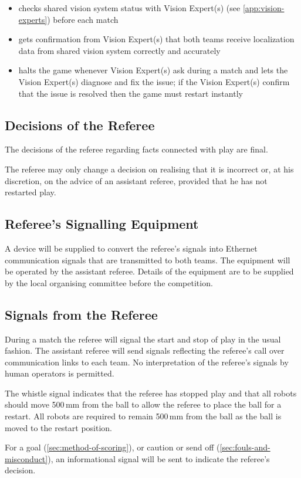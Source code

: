 \begin{itemize}
\item checks shared vision system status with Vision Expert(s) (see \autoref{app:vision-experts}) before each match
\item gets confirmation from Vision Expert(s) that both teams receive localization data from shared vision system correctly and accurately
\item halts the game whenever Vision Expert(s) ask during a match and lets the Vision Expert(s) diagnose and fix the issue; if the Vision Expert(s) confirm that the issue is resolved then the game must restart instantly
\end{itemize}

\subsection{Decisions of the Referee}
The decisions of the referee regarding facts connected with play are final.

The referee may only change a decision on realising that it is incorrect or, at his discretion, on the advice of an assistant referee, provided that he has not restarted play.

\subsection{Referee's Signalling Equipment}
A device will be supplied to convert the referee's signals into Ethernet communication signals that are transmitted to both teams.
The equipment will be operated by the assistant referee.
Details of the equipment are to be supplied by the local organising committee before the competition.

\subsection{Signals from the Referee}
During a match the referee will signal the start and stop of play in the usual fashion.
The assistant referee will send signals reflecting the referee's call over communication links to each team.
No interpretation of the referee's signals by human operators is permitted.

The whistle signal indicates that the referee has stopped play and that all robots should move 500\,mm from the ball to allow the referee to place the ball for a restart.
All robots are required to remain 500\,mm from the ball as the ball is moved to the restart position.

For a goal (\autoref{sec:method-of-scoring}), or caution or send off (\autoref{sec:fouls-and-misconduct}), an informational signal will be sent to indicate the referee's decision.

